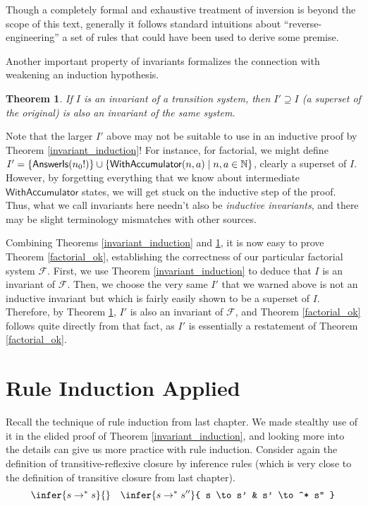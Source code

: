 \documentclass{amsbook}
\newtheorem{theorem}{Theorem}[chapter]
\theoremstyle{definition}
\theoremstyle{remark}
\numberwithin{section}{chapter}
\numberwithin{equation}{chapter}
\begin{document}
Though a completely formal and exhaustive treatment of inversion is beyond the scope of this text, generally it follows standard intuitions about ``reverse-engineering'' a set of rules that could have been used to derive some premise.

Another important property of invariants formalizes the connection with weakening an induction hypothesis.

\begin{theorem}\label{invariant_weaken}
  If $I$ is an invariant of a transition system, then $I' \supseteq I$ (a superset of the original) is also an invariant of the same system.
\end{theorem}

Note that the larger $I'$ above may not be suitable to use in an inductive proof by Theorem \ref{invariant_induction}!
For instance, for factorial, we might define $I' = \mathcal \{\mathsf{AnswerIs}(n_0!)\} \cup \{\mathsf{WithAccumulator}(n, a) \mid n, a \in \mathbb N\}$, clearly a superset of $I$.
However, by forgetting everything that we know about intermediate $\mathsf{WithAccumulator}$ states, we will get stuck on the inductive step of the proof.
Thus, what we call invariants here needn't also be \emph{inductive invariants}, and there may be slight terminology mismatches with other sources.

Combining Theorems \ref{invariant_induction} and \ref{invariant_weaken}, it is now easy to prove Theorem \ref{factorial_ok}, establishing the correctness of our particular factorial system $\mathcal F$.
First, we use Theorem \ref{invariant_induction} to deduce that $I$ is an invariant of $\mathcal F$.
Then, we choose the very same $I'$ that we warned above is not an inductive invariant but which is fairly easily shown to be a superset of $I$.
Therefore, by Theorem \ref{invariant_weaken}, $I'$ is also an invariant of $\mathcal F$, and Theorem \ref{factorial_ok} follows quite directly from that fact, as $I'$ is essentially a restatement of Theorem \ref{factorial_ok}.

\section{Rule Induction Applied}

Recall the technique of rule induction from last chapter.
We made stealthy use of it in the elided proof of Theorem \ref{invariant_induction}, and looking more into the details can give us more practice with rule induction.
Consider again the definition of transitive-reflexive closure by inference rules (which is very close to the definition of transitive closure from last chapter).
$$\infer{s \to^* s}{}
\quad \infer{s \to^* s''}{
  s \to s'
  & s' \to^* s''
}$$
\end{document}
